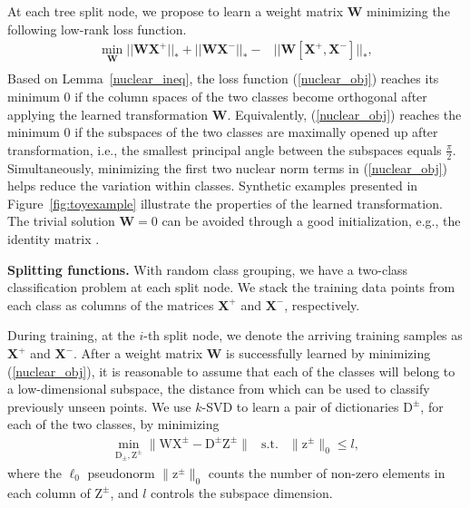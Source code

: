 \documentclass[runningheads]{llncs}
\newcommand{\bb}[1]{\boldsymbol{\mathrm{#1}}}
\begin{document}
At each tree split node, we propose to learn a
weight matrix $\mathbf{W}$  minimizing
the following low-rank loss function.
\begin{align} \label{nuclear_obj} \nonumber
\underset{\mathbf{W}} \min ||\mathbf{W X}^+||_* + ||\mathbf{W X}^-||_* -& ||\mathbf{W [X^+, X^-]}||_*,\\ 
\end{align}
Based on Lemma~\ref{nuclear_ineq}, the loss function (\ref{nuclear_obj}) reaches
its minimum $0$ if the column spaces of the two classes become orthogonal after
applying the learned transformation $\mathbf{W}$. Equivalently,
(\ref{nuclear_obj}) reaches the minimum $0$ if the subspaces of the two classes
are maximally opened up after transformation, i.e., the smallest principal angle
between the subspaces equals $\frac{\pi}{2}$. Simultaneously, minimizing the
first two nuclear norm terms in (\ref{nuclear_obj}) helps reduce the variation
within classes.  Synthetic examples presented in Figure~\ref{fig:toyexample}
illustrate the properties of the learned transformation.  The trivial solution
$\mathbf{W}=0$ can be avoided through a good initialization, e.g., the identity matrix \cite{lowrankT}.


\textbf{Splitting functions.}  With random class grouping, we have a two-class
classification problem at each split node.  We stack the training data points
from each class as columns of the matrices $\mathbf{X}^+$ and $\mathbf{X}^-$,
respectively.
 

During training, at the $i$-th split node, we denote the arriving training
samples as $\mathbf{X}^+$ and $\mathbf{X}^-$.  After a weight matrix
$\mathbf{W}$ is successfully learned by minimizing (\ref{nuclear_obj}), it is
reasonable to assume that each of the classes will belong to a low-dimensional
subspace, the distance from which can be used to classify previously unseen
points.  We use $k$-SVD \cite{Elad_KSVD} to learn a pair of dictionaries
$\bb{D}^{\pm}$, for each of the two classes, by minimizing
\begin{eqnarray}
\min_{\bb{D}_\pm, \bb{Z}^\pm} \|  \bb{WX}^\pm - \bb{D}^\pm \bb{Z}^\pm \|  & \mathrm{s.t.} & \| \bb{z}^\pm \|_0 \le l,
\end{eqnarray}
where the $\ell_0$ pseudonorm $\| \bb{z}^\pm \|_0$ counts the number of non-zero elements in each column of $\bb{Z}^\pm$, and $l$ controls the subspace dimension.
\end{document}
